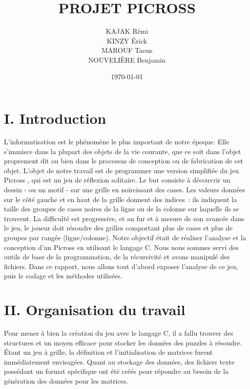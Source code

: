 \documentclass[a4paper,11pt]{article}
\begin{document}
\pagestyle{fancy}
\title{PROJET PICROSS}
\author{KAJAK Rémi\\KINZY Érick\\MAROUF Taous\\NOUVELIÈRE Benjamin}
\date{\today}
\maketitle
\newpage
\tableofcontents
\listoffigures
\newpage
\section*{\LARGE I. \hspace*{0.1cm} Introduction}
\label{section*:introduction}
L’informatisation est le phénomène le plus important de notre époque. Elle s’immisce dans la plupart des objets de la vie courante, que ce soit dans l’objet proprement dit ou bien dans le processus de conception ou de fabrication de cet objet.\bigbreak
L’objet de notre travail est de programmer une version simplifiée du jeu \og Picross \fg{}, qui est un jeu de réflexion solitaire. Le but consiste à découvrir un dessin - ou un motif - sur une grille en noircissant des cases. Les valeurs données sur le côté gauche et en haut de la grille donnent des indices~: ils indiquent la taille des groupes de cases noires de la ligne ou de la colonne sur laquelle ils se trouvent. La difficulté est progressive, et au fur et à mesure de son avancée dans le jeu, le joueur doit résoudre des grilles comportant plus de cases et plus de groupes par rangée (ligne/colonne).\bigbreak
Notre objectif était de réaliser l’analyse et la conception d’un Picross en utilisant le langage C. Nous nous sommes servi des outils de base de la programmation, de la récursivité et avons manipulé des fichiers.\bigbreak
Dans ce rapport, nous allons tout d’abord exposer l’analyse de ce jeu, puis le codage et les méthodes utilisées.
\newpage
\section*{\LARGE II. Organisation du travail}
\label{section*:organisation_travail}
Pour mener à bien la création du jeu avec le langage C, il a fallu trouver des structures et un moyen efficace pour stocker les données des puzzles à résoudre. Étant un jeu à grille, la définition et l'initialisation de matrices furent immédiatement envisagées. Quant au stockage des données, des fichiers texte possédant un format spécifique ont été créés pour répondre au besoin de la génération des données pour les matrices.
\end{document}
